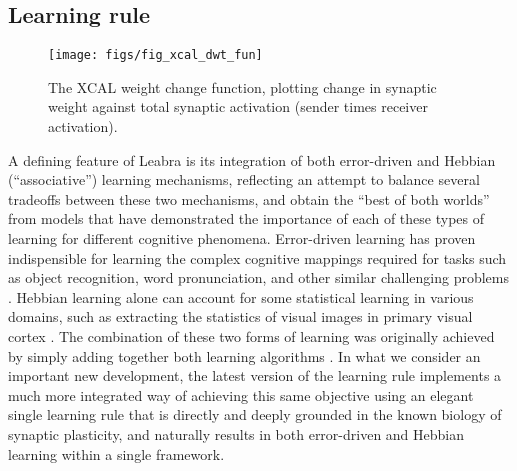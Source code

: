 \documentclass[11pt,twoside]{article}
\begin{document}
\subsection{Learning rule}

\begin{figure}
  \centering\texttt{[image: figs/fig\_xcal\_dwt\_fun]}
  \caption{\small The XCAL weight change function, plotting change in
    synaptic weight against total synaptic activation (sender times receiver
    activation).}
  \label{fig.xcal_fun}
\end{figure}

A defining feature of Leabra is its integration of both error-driven and
Hebbian (``associative'') learning mechanisms, reflecting an attempt to
balance several tradeoffs between these two mechanisms, and obtain the ``best
of both worlds'' from models that have demonstrated the importance of each of
these types of learning for different cognitive phenomena.  Error-driven
learning has proven indispensible for learning the complex cognitive mappings
required for tasks such as object recognition, word pronunciation, and other
similar challenging problems \cite{OReilly96,OReilly98,OReillyMunakata00}.  Hebbian
learning alone can account for some statistical learning in various domains,
such as extracting the statistics of visual images in primary visual cortex
\cite{OlshausenField96,OlshausenField97}.  The combination of these two forms
of learning was originally achieved by simply adding together both learning
algorithms \cite{OReillyMunakata00}.  In what we consider an important new
development, the latest version of the learning rule implements a much more
integrated way of achieving this same objective using an elegant single
learning rule that is directly and deeply grounded in the known biology of
synaptic plasticity, and naturally results in both error-driven and Hebbian
learning within a single framework.
\end{document}
